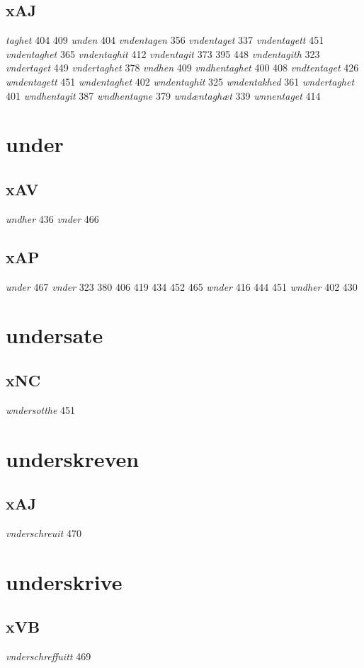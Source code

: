 \documentclass[a4paper,twocolumn]{article}
\begin{document}
\subsection{xAJ}
\label{sec:org947d078}
\emph{taghet} 404 409 \emph{unden} 404 \emph{vndentagen} 356 \emph{vndentaget} 337 \emph{vndentagett} 451 \emph{vndentaghet} 365 \emph{vndentaghit} 412 \emph{vndentagit} 373 395 448 \emph{vndentagith} 323 \emph{vndertaget} 449 \emph{vndertaghet} 378 \emph{vndhen} 409 \emph{vndhentaghet} 400 408 \emph{vndtentaget} 426 \emph{wndentagett} 451 \emph{wndentaghet} 402 \emph{wndentaghit} 325 \emph{wndentakhed} 361 \emph{wndertaghet} 401 \emph{wndhentagit} 387 \emph{wndhentagne} 379 \emph{wndæntaghæt} 339 \emph{wnnentaget} 414 
\section{under}
\label{sec:orgcb27e87}
\subsection{xAV}
\label{sec:orgd809fbe}
\emph{undher} 436 \emph{vnder} 466 
\subsection{xAP}
\label{sec:org2a99d38}
\emph{under} 467 \emph{vnder} 323 380 406 419 434 452 465 \emph{wnder} 416 444 451 \emph{wndher} 402 430 
\section{undersate}
\label{sec:orga36e941}
\subsection{xNC}
\label{sec:orgfbf059c}
\emph{wndersotthe} 451 
\section{underskreven}
\label{sec:orgf5c7ad1}
\subsection{xAJ}
\label{sec:orgc02c91a}
\emph{vnderschreuit} 470 
\section{underskrive}
\label{sec:orga4ed857}
\subsection{xVB}
\label{sec:org258a6d8}
\emph{vnderschreffuitt} 469 
\end{document}
